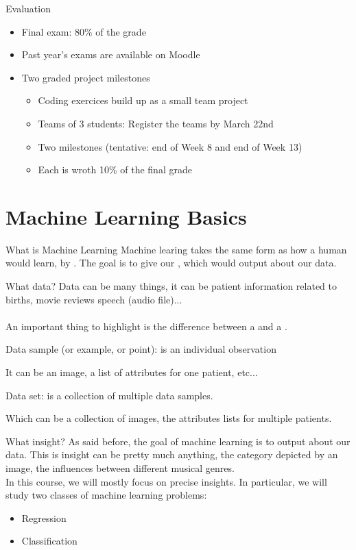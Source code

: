 \begin{parag}{Evaluation}
	\begin{itemize}
		\item Final exam: 80\% of the grade
		\item Past year's exams are available on Moodle
		\item Two graded project milestones
			\begin{itemize}
			    \item Coding exercices build up as a small team project
			    \item Teams of 3 students: Register the teams by March 22nd
				\item Two milestones (tentative: end of Week 8 and end of Week 13)
				\item Each is wroth 10\% of the final grade
			\end{itemize}
	\end{itemize}
	
    
\end{parag}


\section{Machine Learning Basics}
\begin{parag}{What is Machine Learning}
    Machine learing takes the same form as how a human would learn, by . The goal is to give our ,  which would output  about our data.
\end{parag}
\begin{parag}{What data?}
    Data can be many things, it can be patient information related to births, movie reviews speech (audio file)...\\
	$ $\\
	An important thing to highlight is the difference between a  and a .
	\begin{definition}
	Data sample (or example, or point): is an individual observation
	\end{definition}
	It can be an image, a list of attributes for one patient, etc...
	\begin{definition}
	Data set: is a collection of multiple data samples. 
	\end{definition}
	Which can be a collection of images, the attributes lists for multiple patients.
\end{parag}
\begin{parag}{What insight?}
    As said before, the goal of machine learning is to output  about our data. This is insight can be pretty much anything, the category depicted by an image, the influences between different musical genres.\\
	In this course, we will mostly focus on precise insights. In particular, we will study two classes of machine learning problems:
	\begin{itemize}
		\item Regression
		\item Classification
	\end{itemize}
\end{parag}
